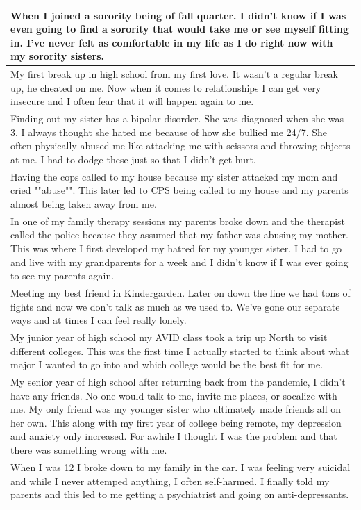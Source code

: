 \documentclass[
  .7em,
  letterpaper,
  DIV=11,
  numbers=noendperiod]{scrartcl}
\begin{document}
\begin{table}
\begin{tabular}{l}
\hline
When I joined a sorority being of fall quarter. I didn't know if I was even going to find a sorority that would take me or see myself fitting in. I've never felt as comfortable in my life as I do right now with my sorority sisters.\\
\hline
My first break up in high school from my first love. It wasn't a regular break up, he cheated on me. Now when it comes to relationships I can get very insecure and I often fear that it will happen again to me.\\
\hline
Finding out my sister has a bipolar disorder. She was diagnosed when she was 3. I always thought she hated me because of how she bullied me 24/7. She often physically abused me like attacking me with scissors and throwing objects at me. I had to dodge these just so that I didn't get hurt.\\
\hline
Having the cops called to my house because my sister attacked my mom and cried ""abuse"". This later led to CPS being called to my house and my parents almost being taken away from me.\\
\hline
In one of my family therapy sessions my parents broke down and the therapist called the police because they assumed that my father was abusing my mother. This was where I first developed my hatred for my younger sister. I had to go and live with my grandparents for a week and I didn't know if I was ever going to see my parents again.\\
\hline
Meeting my best friend in Kindergarden. Later on down the line we had tons of fights and now we don't talk as much as we used to. We've gone our separate ways and at times I can feel really lonely.\\
\hline
My junior year of high school my AVID class took a trip up North to visit different colleges. This was the first time I actually started to think about what major I wanted to go into and which college would be the best fit for me.\\
\hline
My senior year of high school after returning back from the pandemic, I didn't have any friends. No one would talk to me, invite me places, or socalize with me. My only friend was my younger sister who ultimately made friends all on her own. This along with my first year of college being remote, my depression and anxiety only increased. For awhile I thought I was the problem and that there was something wrong with me.\\
\hline
When I was 12 I broke down to my family in the car. I was feeling very suicidal and while I never attemped anything, I often self-harmed. I finally told my parents and this led to me getting a psychiatrist and going on anti-depressants.\\

\end{tabular}
\end{table}
\end{document}
